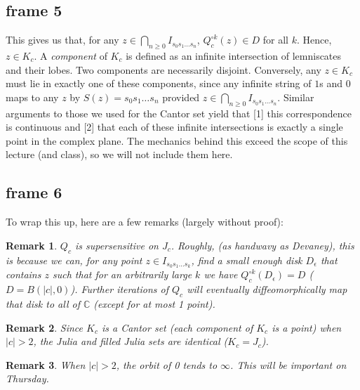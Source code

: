 \documentclass[xcolor=x11names,compress]{beamer}
\renewcommand{\(}{\begin{columns}}
\renewcommand{\)}{\end{columns}}
\newcommand{\<}[1]{\begin{column}{#1}}
\renewcommand{\>}{\end{column}}
\newtheorem{rmk}{Remark}
\begin{document}
\subsection{frame 5}
\begin{frame}
This gives us that, for any $z \in \bigcap_{n\ge 0} I_{s_0s_1\ldots s_n}$, $Q_c^{\circ k} (z) \in D$ for all $k$. Hence, $z \in K_c$.
\vspace{0.4cm}
\pause
A \textsl{component} of $K_c$ is defined as an infinite intersection of lemniscates and their lobes. Two components are necessarily disjoint.
\vspace{0.4cm}
\pause
Conversely, any $z \in K_c$ must lie in exactly one of these components, since any infinite string of $1$s and $0$
maps to any $z$ by $S(z) = s_0s_1\ldots s_n$ provided $z\in \bigcap_{n\ge 0} I_{s_0s_1 \ldots s_n}$.
\vspace{0.4cm}
\pause
Similar arguments to those we used for the Cantor set yield that [1] this correspondence is continuous and [2] that each of these infinite intersections is exactly a single point in the complex plane. The mechanics behind this exceed the scope of this lecture (and class), so we will not include them here.
\end{frame}
\subsection{frame 6}
\begin{frame}
To wrap this up, here are a few remarks (largely without proof):
\vspace{.1cm}
\pause
\begin{rmk}
$Q_c$ is supersensitive on $J_c$. Roughly, (as handwavy as Devaney), this is because we can, for any point $z \in I_{s_0s_1\ldots s_k}$, find a small enough disk $D_{\epsilon}$ that contains $z$ such that for an arbitrarily large $k$ we have $Q_c^{\circ k}(D_{\epsilon}) = D$ ($D = B(|c|,0)$). Further iterations of $Q_c$ will eventually diffeomorphically map that disk to
all of $\mathbb{C}$ (except for at most 1 point).
\end{rmk}
\pause
\begin{rmk}
Since $K_c$ is a Cantor set (each component of $K_c$ is a point) when $|c| > 2$, the Julia and filled Julia sets are identical ($K_c = J_c$).
\end{rmk}
\pause
\begin{rmk}
When $|c| > 2$, the orbit of 0 tends to $\infty$. This will be important on Thursday.
\end{rmk}
\end{frame}
\end{document}
